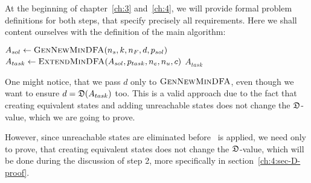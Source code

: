 At the beginning of chapter~\ref{ch:3} and~\ref{ch:4}, we will provide formal problem definitions for both steps, that specify precisely all requirements. Here we shall content ourselves with the definition of the main algorithm:
\vspace{0.2cm}
\begin{algorithmic}[1]
	\State $A_{sol} \gets \textsc{GenNewMinDFA}({n_s}, k, {n_F}, d, p_{sol})$
	\State $A_{task} \gets \textsc{ExtendMinDFA}(A_{sol}, p_{task}, {n_e}, {n_u}, c)$
	\State \Return $A_{task}$
	\EndFunction
\end{algorithmic}
\vspace{0.2cm}
\noindent One might notice, that we pass $d$ only to $\textsc{GenNewMinDFA}$, even though we want to ensure $d = \mathfrak{D}(A_{task})$ too. This is a valid approach due to the fact that creating equivalent states and adding unreachable states does not change the $\mathfrak{D}$-value, which we are going to prove. 

However, since unreachable states are eliminated before \CompDist\ is applied, we need only to prove, that creating equivalent states does not change the $\mathfrak{D}$-value, which will be done during the discussion of step 2, more specifically in section~\ref{ch:4:sec-D-proof}.


